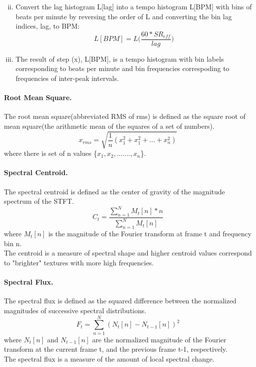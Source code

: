\begin{enumerate}[(i)]
\begin{equation}
                \end{equation}
        \item Convert the lag histogram L[lag] into a tempo histogram L[BPM] with bins of beats per
                minute by reversing the order of L and converting the bin lag indices, lag, to BPM:
                \begin{equation}
                        L[BPM] = L\Big(\frac{60*SR_{eff}}{lag}\Big)
                \end{equation}
        \item The result of step (x), L[BPM], is a tempo histogram with bin labels corresponding to beats 
                per minute and bin frequencies correspoding to frequencies of inter-peak intervals.

\end{enumerate}
\paragraph{Root Mean Square.}
The root mean square(abbreviated RMS of rms) is defined as the square root of mean square(the arithmetic mean
of the squares of a set of numbers).
\begin{equation}
        x_{rms} = \sqrt{\frac{1}{n}(x_1^2+x_1^2+...+x_n^2)}
\end{equation}
where there is set of n values \{$x_1, x_2, ......., x_n$\}.

\paragraph{Spectral Centroid.}
The spectral centroid is defined as the center of gravity of the magnitude spectrum of the STFT.
\begin{equation}
        C_t = \frac{\sum\limits_{n=1}^{N}{M_t[n]*n}}{\sum\limits_{n=1}^{N}{M_t[n]}}
\end{equation}
where $M_t[n]$ is the magnitude of the Fourier transform at frame t and frequency bin n.\\
The centroid is a measure of spectral shape and higher centroid values correspond to "brighter" textures with more high frequencies.

\paragraph{Spectral Flux.}
The spectral flux is defined as the squared difference between the normalized magnitudes of successive spectral distributions.
\begin{equation}
        F_t = \sum_{n=1}^{N}{(N_t[n]-N_{t-1}[n])^2}
\end{equation}
where $N_t[n]$ and $N_{t-1}[n]$ are the normalized magnitude of the Fourier transform at the current frame t, and the previous frame t-1, 
respectively.\\ 
The spectral flux is a measure of the amount of local spectral change.

